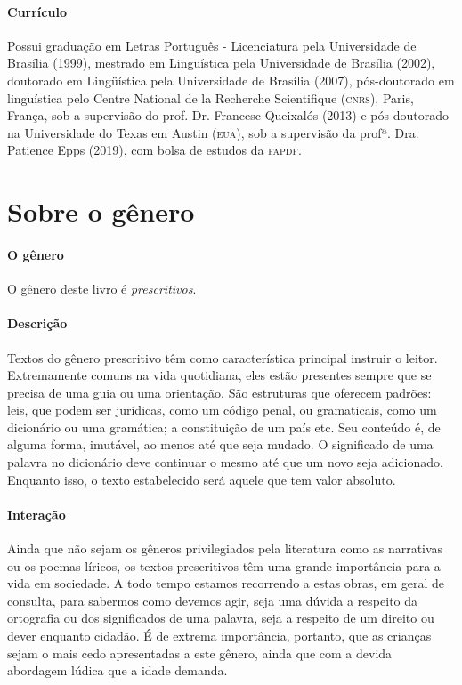 \documentclass[11pt]{extarticle}
\begin{document}
{{\paragraph{Currículo}
Possui graduação em Letras Português - Licenciatura pela Universidade de Brasília (1999), mestrado em Linguística pela Universidade de Brasília (2002), doutorado em Lingüística pela Universidade de Brasília (2007), pós-doutorado em linguística pelo Centre National de la Recherche Scientifique (\textsc{cnrs}), Paris, França, sob a supervisão do prof. Dr. Francesc Queixalós (2013) e pós-doutorado na Universidade do Texas em Austin (\textsc{eua}), sob a supervisão da profª. Dra. Patience Epps (2019), com bolsa de estudos da \textsc{fapdf}. 


\section{Sobre o gênero}

\paragraph{O gênero} O gênero deste livro é \textit{prescritivos}. 


\paragraph{Descrição} 
Textos do gênero prescritivo têm como característica principal instruir
o leitor. Extremamente comuns na vida quotidiana, eles estão presentes
sempre que se precisa de uma guia ou uma orientação. São estruturas 
que oferecem padrões: leis, que podem ser jurídicas, como um código
penal, ou gramaticais, como um dicionário ou uma gramática; a constituição
de um país etc. Seu conteúdo é, de alguma forma, imutável, ao menos até que seja
mudado. O significado de uma palavra no dicionário deve continuar o mesmo
até que um novo seja adicionado. Enquanto isso, o texto
estabelecido será aquele que tem valor absoluto.


\paragraph{Interação} 
Ainda que não sejam os gêneros privilegiados pela literatura
como as narrativas ou os poemas líricos, os textos prescritivos
têm uma grande importância para a vida em sociedade. A todo 
tempo estamos recorrendo a estas obras, em geral de consulta, para
sabermos como devemos agir, seja uma dúvida a respeito da ortografia ou 
dos significados de uma palavra, seja a respeito de um direito ou dever
enquanto cidadão. É de extrema importância, portanto, que as crianças
sejam o mais cedo apresentadas a este gênero, ainda que com a 
devida abordagem lúdica que a idade demanda. 

}}
\end{document}
